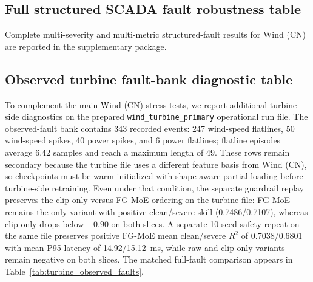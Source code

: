 \documentclass[review,1p,times]{elsarticle}
\begin{document}
\subsection{Full structured SCADA fault robustness table}
\label{subsec:robust_structured_full}
Complete multi-severity and multi-metric structured-fault results for Wind (CN) are reported in the supplementary package.

\subsection{Observed turbine fault-bank diagnostic table}
\label{subsec:turbine_observed_faults}
To complement the main Wind (CN) stress tests, we report additional turbine-side diagnostics on the prepared \texttt{wind\_turbine\_primary} operational run file. The observed-fault bank contains 343 recorded events: 247 wind-speed flatlines, 50 wind-speed spikes, 40 power spikes, and 6 power flatlines; flatline episodes average 6.42 samples and reach a maximum length of 49. These rows remain secondary because the turbine file uses a different feature basis from Wind (CN), so checkpoints must be warm-initialized with shape-aware partial loading before turbine-side retraining. Even under that condition, the separate guardrail replay preserves the clip-only versus FG-MoE ordering on the turbine file: FG-MoE remains the only variant with positive clean/severe skill (0.7486/0.7107), whereas clip-only drops below $-0.90$ on both slices. A separate 10-seed safety repeat on the same file preserves positive FG-MoE mean clean/severe $R^2$ of 0.7038/0.6801 with mean P95 latency of 14.92/15.12~ms, while raw and clip-only variants remain negative on both slices. The matched full-fault comparison appears in Table~\ref{tab:turbine_observed_faults}.
\end{document}
